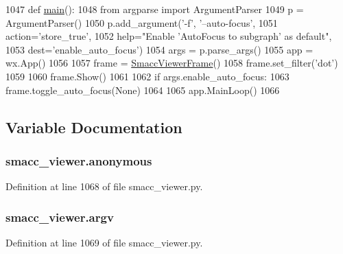 \begin{DoxyCode}
1047 \textcolor{keyword}{def }\hyperlink{namespacesmacc__viewer_a04f8486232a137775a5ed79921b54f7b}{main}():
1048     \textcolor{keyword}{from} argparse \textcolor{keyword}{import} ArgumentParser
1049     p = ArgumentParser()
1050     p.add\_argument(\textcolor{stringliteral}{'-f'}, \textcolor{stringliteral}{'--auto-focus'},
1051                  action=\textcolor{stringliteral}{'store\_true'},
1052                  help=\textcolor{stringliteral}{"Enable 'AutoFocus to subgraph' as default"},
1053                  dest=\textcolor{stringliteral}{'enable\_auto\_focus'})
1054     args = p.parse\_args()
1055     app = wx.App()
1056 
1057     frame = \hyperlink{classsmacc__viewer_1_1SmaccViewerFrame}{SmaccViewerFrame}()
1058     frame.set\_filter(\textcolor{stringliteral}{'dot'})
1059 
1060     frame.Show()
1061 
1062     \textcolor{keywordflow}{if} args.enable\_auto\_focus:
1063         frame.toggle\_auto\_focus(\textcolor{keywordtype}{None})
1064 
1065     app.MainLoop()
1066 
\end{DoxyCode}


\subsection{Variable Documentation}
\subsubsection[{\texorpdfstring{anonymous}{anonymous}}]{\setlength{\rightskip}{0pt plus 5cm}smacc\+\_\+viewer.\+anonymous}\hypertarget{namespacesmacc__viewer_ad62ed6f205d2dad9939d6340049681fe}{}\label{namespacesmacc__viewer_ad62ed6f205d2dad9939d6340049681fe}


Definition at line 1068 of file smacc\+\_\+viewer.\+py.

\subsubsection[{\texorpdfstring{argv}{argv}}]{\setlength{\rightskip}{0pt plus 5cm}smacc\+\_\+viewer.\+argv}\hypertarget{namespacesmacc__viewer_a641e44a1c9c09b36c59a0651d01d4d97}{}\label{namespacesmacc__viewer_a641e44a1c9c09b36c59a0651d01d4d97}


Definition at line 1069 of file smacc\+\_\+viewer.\+py.

